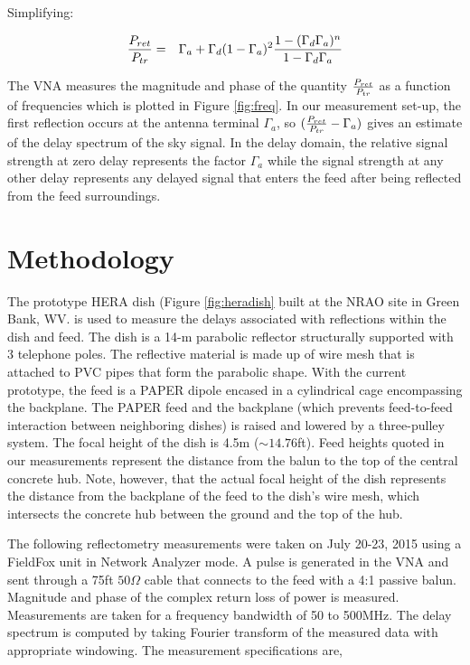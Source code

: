 \documentclass[12pt,preprint]{aastex}
\begin{document}
Simplifying:
 
  \begin{eqnarray}
 {P_{ret} \over P_{tr} } & = & \Gamma_{a}
  +  \Gamma_{d}(1-\Gamma_a)^{2}  {1-(\Gamma_{d}\Gamma_{a})^{n} \over 1-\Gamma_{d} \Gamma_{a} } \nonumber\\
\end{eqnarray}

The VNA measures the magnitude and phase of the quantity ${P_{ret}\over P_{tr}}$ as a function of frequencies which is plotted in Figure \ref{fig:freq}. In our measurement set-up, the first reflection occurs at the antenna terminal $\Gamma_{a}$, so $({P_{ret} \over P_{tr} }  - \Gamma_{a}) $ gives an estimate of the delay spectrum of the sky signal. In the delay domain, the relative signal strength at zero delay represents the factor $\Gamma_{a}$ while the signal strength at any other delay represents any delayed signal that enters the feed after being reflected from the feed surroundings. 

\section{Methodology}{\label{sec:methods}}

The prototype HERA dish (Figure \ref{fig:heradish} built at the NRAO site in
Green Bank, WV. is used to measure the delays associated with reflections within the dish and feed.
The dish is a 14-m parabolic reflector structurally supported
with 3 telephone poles. The reflective material is made up of wire mesh that
is attached to PVC pipes that form the parabolic shape. With the current
prototype, the feed is a PAPER dipole encased in a cylindrical cage encompassing
the backplane. The PAPER feed and the backplane (which prevents feed-to-feed
interaction between neighboring dishes) is raised and lowered by a three-pulley
system. The focal height of the dish is 4.5m ($\sim{14.76}$ft). Feed heights quoted in our measurements represent the distance from the balun to the top of the central concrete hub. Note, however, that the actual focal height of the dish represents the distance from the backplane of the feed to the dish's wire mesh, which intersects the concrete hub between the ground and the top of the hub. 

The following reflectometry measurements were taken on July 20-23, 2015 using a
FieldFox unit in Network Analyzer mode. A pulse is generated in the VNA
and sent through a 75ft $50\Omega$ cable that connects to the feed with a 4:1
passive balun. Magnitude and phase of the complex return loss of power is measured.
Measurements are taken for a frequency bandwidth of 50 to 500MHz. The delay spectrum is computed by taking Fourier transform of the measured data with appropriate windowing. The measurement specifications are, 
\end{document}
